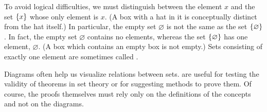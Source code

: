 \begin{note}
  To avoid logical difficulties, we must distinguish between the element \(x\) and the set \(\left\lbrace x\right\rbrace\) whose only element is \(x\).
  (A box with a hat in it is conceptually distinct from the hat itself.)
  In particular, the empty set \(\varnothing\) is not the same as the set \(\left\lbrace\varnothing\right\rbrace\).
  In fact, the empty set \(\varnothing\) contains no elements, whereas the set \(\left\lbrace\varnothing\right\rbrace\) has one element, \(\varnothing\).
  (A box which contains an empty box is not empty.)
  Sets consisting of exactly one element are sometimes called \textbf{}.
\end{note}

\begin{note}
  Diagrams often help us visualize relations between sets.
  \textbf{} are useful for testing the validity of theorems in set theory or for suggesting methods to prove them.
  Of course, the proofs themselves must rely only on the definitions of the concepts and not on the diagrams.
\end{note}
